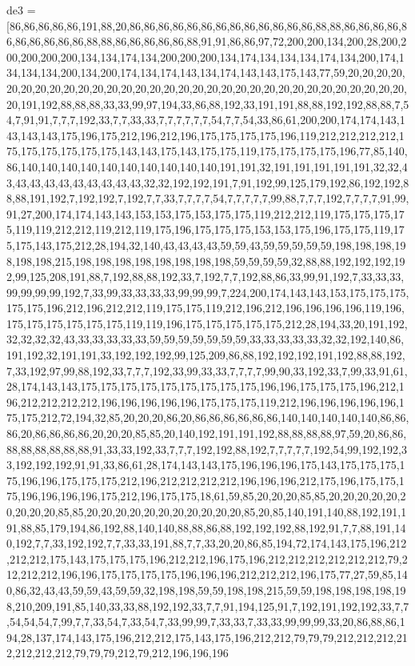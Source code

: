 de3 = [86,86,86,86,86,191,88,20,86,86,86,86,86,86,86,86,86,86,86,86,86,88,88,86,86,86,86,86,86,86,86,86,86,88,88,86,86,86,86,86,88,91,91,86,86,97,72,200,200,134,200,28,200,200,200,200,200,134,134,174,134,200,200,200,134,174,134,134,134,174,134,200,174,134,134,134,200,134,200,174,134,174,143,134,174,143,143,175,143,77,59,20,20,20,20,20,20,20,20,20,20,20,20,20,20,20,20,20,20,20,20,20,20,20,20,20,20,20,20,20,20,20,20,20,191,192,88,88,88,33,33,99,97,194,33,86,88,192,33,191,191,88,88,192,192,88,88,7,54,7,91,91,7,7,7,192,33,7,7,33,33,7,7,7,7,7,7,54,7,7,54,33,86,61,200,200,174,174,143,143,143,143,175,196,175,212,196,212,196,175,175,175,175,196,119,212,212,212,212,175,175,175,175,175,175,143,143,175,143,175,175,119,175,175,175,175,196,77,85,140,86,140,140,140,140,140,140,140,140,140,140,191,191,32,191,191,191,191,191,32,32,43,43,43,43,43,43,43,43,43,43,32,32,192,192,191,7,91,192,99,125,179,192,86,192,192,88,88,191,192,7,192,192,7,192,7,7,33,7,7,7,7,54,7,7,7,7,7,99,88,7,7,7,192,7,7,7,7,91,99,91,27,200,174,174,143,143,153,153,175,153,175,175,119,212,212,119,175,175,175,175,119,119,212,212,119,212,119,175,196,175,175,175,153,153,175,196,175,175,119,175,175,143,175,212,28,194,32,140,43,43,43,43,59,59,43,59,59,59,59,59,198,198,198,198,198,198,215,198,198,198,198,198,198,198,198,59,59,59,59,32,88,88,192,192,192,192,99,125,208,191,88,7,192,88,88,192,33,7,192,7,7,192,88,86,33,99,91,192,7,33,33,33,99,99,99,99,192,7,33,99,33,33,33,33,99,99,99,7,224,200,174,143,143,153,175,175,175,175,175,196,212,196,212,212,119,175,175,119,212,196,212,196,196,196,196,119,196,175,175,175,175,175,175,119,119,196,175,175,175,175,175,212,28,194,33,20,191,192,32,32,32,32,43,33,33,33,33,33,59,59,59,59,59,59,59,33,33,33,33,33,32,32,192,140,86,191,192,32,191,191,33,192,192,192,99,125,209,86,88,192,192,192,191,192,88,88,192,7,33,192,97,99,88,192,33,7,7,7,192,33,99,33,33,7,7,7,7,99,90,33,192,33,7,99,33,91,61,28,174,143,143,175,175,175,175,175,175,175,175,175,196,196,175,175,175,196,212,196,212,212,212,212,196,196,196,196,196,175,175,175,119,212,196,196,196,196,196,175,175,212,72,194,32,85,20,20,20,86,20,86,86,86,86,86,86,140,140,140,140,140,86,86,86,20,86,86,86,86,20,20,20,85,85,20,140,192,191,191,192,88,88,88,88,97,59,20,86,86,88,88,88,88,88,88,91,33,33,192,33,7,7,7,192,192,88,192,7,7,7,7,7,192,54,99,192,192,33,192,192,192,91,91,33,86,61,28,174,143,143,175,196,196,196,175,143,175,175,175,175,196,196,175,175,175,212,196,212,212,212,212,196,196,196,212,175,196,175,175,175,196,196,196,196,175,212,196,175,175,18,61,59,85,20,20,20,85,85,20,20,20,20,20,20,20,20,20,85,85,20,20,20,20,20,20,20,20,20,20,20,85,20,85,140,191,140,88,192,191,191,88,85,179,194,86,192,88,140,140,88,88,86,88,192,192,192,88,192,91,7,7,88,191,140,192,7,7,33,192,192,7,7,33,33,191,88,7,7,33,20,20,86,85,194,72,174,143,175,196,212,212,212,175,143,175,175,175,196,212,212,196,175,196,212,212,212,212,212,212,79,212,212,212,196,196,175,175,175,175,196,196,196,212,212,212,196,175,77,27,59,85,140,86,32,43,43,59,59,43,59,59,32,198,198,59,59,198,198,215,59,59,198,198,198,198,198,210,209,191,85,140,33,33,88,192,192,33,7,7,91,194,125,91,7,192,191,192,192,33,7,7,54,54,54,7,99,7,7,33,54,7,33,54,7,33,99,99,7,33,33,7,33,33,99,99,99,33,20,86,88,86,194,28,137,174,143,175,196,212,212,175,143,175,196,212,212,79,79,79,212,212,212,212,212,212,212,79,79,79,212,79,212,196,196,196